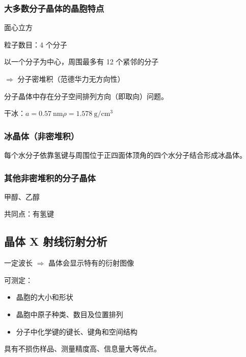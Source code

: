             \subsubsection{大多数分子晶体的晶胞特点}

                面心立方

                粒子数目：4 个分子

                以一个分子为中心，周围最多有 12 个紧邻的分子

                \(\Rightarrow\) 分子密堆积（范德华力无方向性）

                分子晶体中存在分子空间排列方向（即取向）问题。

                干冰：\quad \(a=\SI{0.57}{\nm}\)\quad \(\rho=\SI{1.578}{\g\per\cubic\cm}\)


            \subsubsection{冰晶体（非密堆积）}

                每个水分子依靠氢键与周围位于正四面体顶角的四个水分子结合形成冰晶体。


            \subsubsection{其他非密堆积的分子晶体}

                甲醇、乙醇

                共同点：有氢键

        \subsection{晶体 X 射线衍射分析}\label{subsec:晶体X射线衍射分析}

            一定波长 \(\Rightarrow\) 晶体会显示特有的衍射图像

            可测定：

            \begin{itemize}
                \item 晶胞的大小和形状
                \item 晶胞中原子种类、数目及位置排列
                \item 分子中化学键的键长、键角和空间结构
            \end{itemize}

            具有不损伤样品、测量精度高、信息量大等优点。
